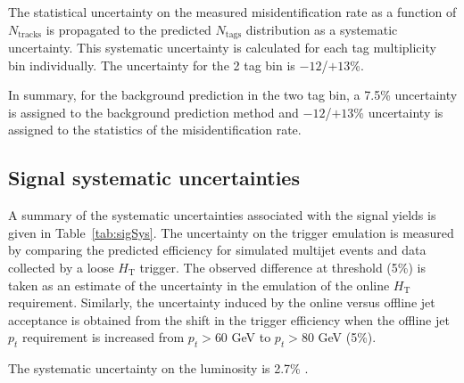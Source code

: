 The statistical uncertainty on the measured misidentification rate as a
function of $N_{\textrm{tracks}}$ is propagated to the predicted
$N_{\textrm{tags}}$ distribution as a systematic uncertainty. This systematic uncertainty 
is calculated for each tag multiplicity bin individually. The uncertainty for the 2 tag
bin is ${-}12$/$+13$\%.

In summary, for the background prediction in the two tag bin, a 7.5\% uncertainty is assigned to the
background prediction method and ${-}12$/$+13$\% uncertainty is assigned to 
the statistics of the misidentification rate. 

\subsection{Signal systematic uncertainties}
\label{sec:sigsys}
A summary of the systematic uncertainties associated with the signal
yields is given in Table~\ref{tab:sigSys}.  The uncertainty on the
trigger emulation is measured by comparing the predicted efficiency
for simulated multijet events and data collected by a loose
$H_{\textrm{T}}$ trigger. The observed difference at threshold (5\%)
is taken as an estimate of the uncertainty in the emulation of the
online $H_{\textrm{T}}$ requirement.  Similarly, the uncertainty
induced by the online versus offline jet acceptance is obtained from
the shift in the trigger efficiency when the offline jet $p_{t}$
requirement is increased from $p_{t}>60$ GeV to $p_{t}>80$ GeV (5\%).

The systematic uncertainty on the luminosity is 2.7\% \cite{LUMI}.


